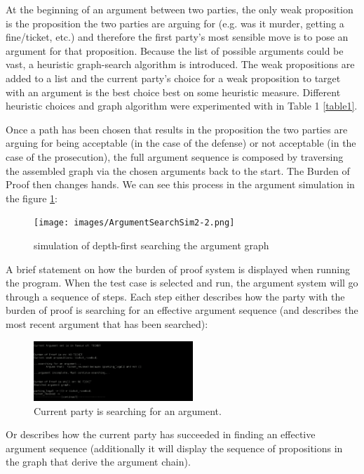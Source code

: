 \documentclass[10pt,a4paper,twocolumn]{article}
\begin{document}
At the beginning of an argument between two parties, the only weak
proposition is the proposition the two parties are arguing for (e.g. was it murder,
getting a fine/ticket, etc.) and therefore the first party's most sensible move is to
pose an argument for that proposition. Because the list of possible arguments
could be vast, a heuristic graph-search algorithm is introduced. The weak propositions
are added to a list and the current party's choice for a weak proposition
to target with an argument is the best choice best on some heuristic measure.
Different heuristic choices and graph algorithm were experimented with in Table
1 \ref{table1}.

Once a path has been chosen that results in the
proposition the two parties are arguing for being acceptable (in the case of the defense) or not
acceptable (in the case of the prosecution), the full argument sequence is
composed by traversing the assembled graph via the chosen arguments back to the start.
The Burden of Proof then changes hands. We can see this process in the argument
simulation in the figure \ref{simOfHeuristics}:

\begin{figure}[h!]
	\label{simOfHeuristics}
	\texttt{[image: images/ArgumentSearchSim2-2.png]}
	\centering
	\caption{simulation of depth-first searching the argument graph}
\end{figure}

A brief statement on how the burden of proof system is displayed when running
the program. When the test case is selected and run, the argument system will go
through a sequence of steps. Each step either describes how the party with the
burden of proof is searching for an effective argument sequence (and describes
the most recent argument that has been searched):

\begin{figure}[h!]
	\label{screen1}
	\includegraphics[width=6cm]{images/screeen1.png}
	\centering
	\caption{Current party is searching for an argument.}
\end{figure}

Or describes how the current party has succeeded in finding an effective
argument sequence (additionally it will display the sequence of propositions in the graph
that derive the argument chain).
\end{document}
